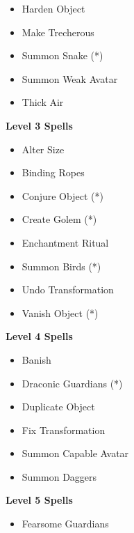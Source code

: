 \begin{multicols}{4}
{\begin{itemize}[itemsep=0em]
\item Harden Object

\item Make Trecherous

\item Summon Snake (*) 

\item Summon Weak Avatar

\item Thick Air


\end{itemize}
\textbf{Level 3 Spells}
\begin{itemize}[itemsep=0em]
\renewcommand\labelitemi{-}
\item Alter Size

\item Binding Ropes

\item Conjure Object (*) 

\item Create Golem (*) 

\item Enchantment Ritual

\item Summon Birds (*) 

\item Undo Transformation

\item Vanish Object (*) 


\end{itemize}
\textbf{Level 4 Spells}
\begin{itemize}[itemsep=0em]
\renewcommand\labelitemi{-}
\item Banish

\item Draconic Guardians (*) 

\item Duplicate Object

\item Fix Transformation

\item Summon Capable Avatar

\item Summon Daggers


\end{itemize}
\textbf{Level 5 Spells}
\begin{itemize}[itemsep=0em]
\renewcommand\labelitemi{-}
\item Fearsome Guardians


\end{itemize}}
\end{multicols}
